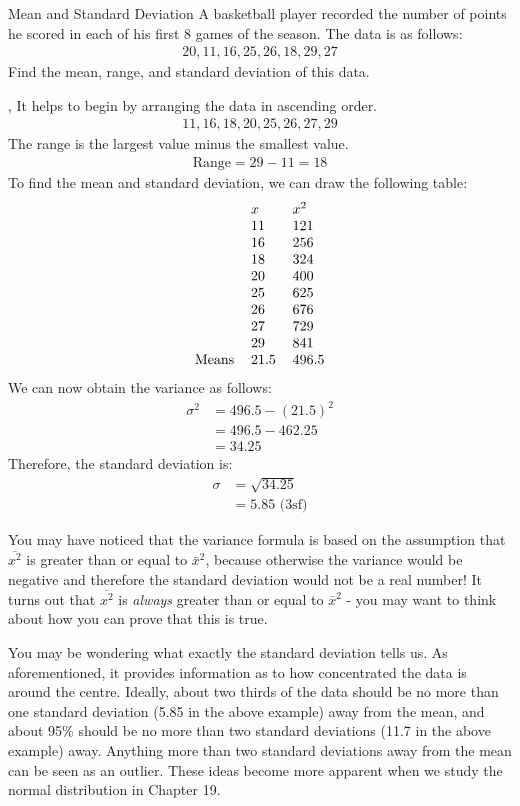 \begin{example}{Mean and Standard Deviation}
A basketball player recorded the number of points he scored in each of his first 8 games of the season. The data is as follows:
\begin{align}
    20, 11, 16, 25, 26, 18, 29, 27
\end{align}
Find the mean, range, and standard deviation of this data.

\sep
It helps to begin by arranging the data in ascending order.
\begin{align}
    11, 16, 18, 20, 25, 26, 27, 29
\end{align}
The range is the largest value minus the smallest value.
\begin{align}
    \text{Range} = 29 - 11 = 18
\end{align}
To find the mean and standard deviation, we can draw the following table:
\begin{align}
\begin{tabular}{lll}
 & $x$ & $x^2$ \\
 & 11 & 121 \\
 & 16 & 256 \\
 & 18 & 324 \\
 & 20 & 400 \\
 & 25 & 625 \\
 & 26 & 676 \\
 & 27 & 729 \\
 & 29 & 841 \\
Means & 21.5 & 496.5
\end{tabular}
\end{align}
We can now obtain the variance as follows:
\begin{align}
    \sigma^2 &= 496.5 - (21.5)^2 \\
    &= 496.5 - 462.25 \\
    &= 34.25
\end{align}
Therefore, the standard deviation is:
\begin{align}
    \sigma &= \sqrt{34.25} \\
    &= 5.85 \text{ (3sf)}
\end{align}
\subtitle{Insight}
You may have noticed that the variance formula is based on the assumption that $\overline{x^2}$ is greater than or equal to $\bar{x}^2$, because otherwise the variance would be negative and therefore the standard deviation would not be a real number! It turns out that $\overline{x^2}$ is \textit{always} greater than or equal to $\bar{x}^2$ - you may want to think about how you can prove that this is true.
\end{example}
You may be wondering what exactly the standard deviation tells us. As aforementioned, it provides information as to how concentrated the data is around the centre. Ideally, about two thirds of the data should be no more than one standard deviation (5.85 in the above example) away from the mean, and about 95\% should be no more than two standard deviations (11.7 in the above example) away. Anything more than two standard deviations away from the mean can be seen as an outlier. These ideas become more apparent when we study the normal distribution in Chapter 19.